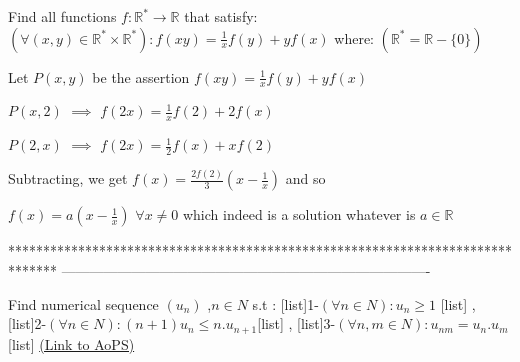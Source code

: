 \begin{solution}
	\begin{tcolorbox}Find all functions $f:\mathbb{R}^{*}\to\mathbb{R}$  that satisfy: 
$\left(\forall  (x,y) \in \mathbb{R}^{*}\times\mathbb{R}^{*}\right)  :f(xy)=\frac{1}{x}f(y)+yf(x)$
where: $\left(\mathbb{R}^{*}=\mathbb{R}-\{0\}\right)$\end{tcolorbox}
Let $P(x,y)$ be the assertion $f(xy)=\frac 1xf(y)+yf(x)$

$P(x,2)$ $\implies$ $f(2x)=\frac 1xf(2)+2f(x)$

$P(2,x)$ $\implies$ $f(2x)=\frac 12f(x)+xf(2)$

Subtracting, we get $f(x)=\frac{2f(2)}3(x-\frac 1x)$ and so 

$\boxed{f(x)=a\left(x-\frac 1x\right)}$ $\forall x\ne 0$ which indeed is a solution whatever is $a\in\mathbb R$
\end{solution}
*******************************************************************************
-------------------------------------------------------------------------------

\begin{problem}
	Find numerical sequence $(u_{n})$ ,$n\in N$ s.t : [list]1-$(\forall n\in N): u_{n}\geq{1}$ [\/list] , [list]2-$(\forall n\in N): (n+1)u_{n}\leq{n.u_{n+1}}$[\/list] , [list]3-$(\forall n,m\in N):u_{nm}=u_{n}.u_{m}$[\/list]
	\flushright \href{https://artofproblemsolving.com/community/c6h480787}{(Link to AoPS)}
\end{problem}



